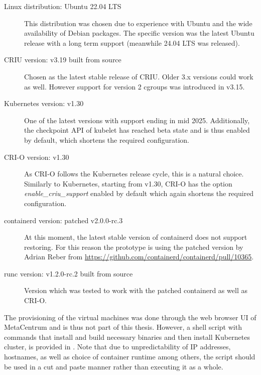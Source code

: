\documentclass[
  digital,     %
  oneside,     %
  nosansbold,  %
  nocolorbold, %
  lof,         %
  lot,         %
]{fithesis4}
\begin{document}
\begin{description}
    \item[Linux distribution: Ubuntu 22.04 LTS] This distribution was chosen due to experience with Ubuntu and the wide availability of Debian packages. The specific version was the latest Ubuntu release with a long term support (meanwhile 24.04 LTS was released).
    
    \item[CRIU version: v3.19 built from source] Chosen as the latest stable release of CRIU. Older 3.x versions could work as well. However support for version 2 cgroups was introduced in v3.15.
    
    \item[Kubernetes version: v1.30] One of the latest versions with support ending in mid 2025. Additionally, the checkpoint API of kubelet has reached beta state and is thus enabled by default, which shortens the required configuration.

    \item[CRI-O version: v1.30] As CRI-O follows the Kubernetes release cycle, this is a natural choice. Similarly to Kubernetes, starting from v1.30, CRI-O has the option \emph{enable\_criu\_support} enabled by default which again shortens the required configuration.
        
    \item[containerd version: patched v2.0.0-rc.3] At this moment, the latest stable version of containerd does not support restoring. For this reason the prototype is using the patched version by Adrian Reber from \url{https://github.com/containerd/containerd/pull/10365}.

    \item[runc version: v1.2.0-rc.2 built from source] Version which was tested to work with the patched containerd as well as CRI-O. %

\end{description}

The provisioning of the virtual machines was done through the web browser UI of MetaCentrum and is thus not part of this thesis. However, a shell script with commands that install and build necessary binaries and then install Kubernetes cluster, is provided in . Note that due to unpredictability of IP addresses, hostnames, as well as choice of container runtime among others, the script should be used in a cut and paste manner rather than executing it as a whole.
\end{document}
